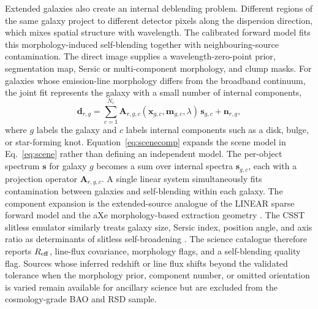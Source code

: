 Extended galaxies also create an internal deblending problem. Different regions of the same galaxy project to different detector pixels along the dispersion direction, which mixes spatial structure with wavelength. The calibrated forward model fits this morphology-induced self-blending together with neighbouring-source contamination. The direct image supplies a wavelength-zero-point prior, segmentation map, Sersic or multi-component morphology, and clump masks. For galaxies whose emission-line morphology differs from the broadband continuum, the joint fit represents the galaxy with a small number of internal components,
\begin{equation}
  \mathbf{d}_{r,g} =
  \sum_{c=1}^{N_c}
  \mathbf{A}_{r,g,c}(\mathbf{x}_{g,c},\mathbf{m}_{g,c},\lambda)\,
  \mathbf{s}_{g,c}
  +\mathbf{n}_{r,g},
  \label{eq:scenecomp}
\end{equation}
where $g$ labels the galaxy and $c$ labels internal components such as a disk, bulge, or star-forming knot. Equation~\eqref{eq:scenecomp} expands the scene model in Eq.~\eqref{eq:scene} rather than defining an independent model. The per-object spectrum $\mathbf{s}$ for galaxy $g$ becomes a sum over internal spectra $\mathbf{s}_{g,c}$, each with a projection operator $\mathbf{A}_{r,g,c}$. A single linear system simultaneously fits contamination between galaxies and self-blending within each galaxy. The component expansion is the extended-source analogue of the LINEAR sparse forward model and the aXe morphology-based extraction geometry \cite{axe2009,linear2018}. The CSST slitless emulator similarly treats galaxy size, Sersic index, position angle, and axis ratio as determinants of slitless self-broadening \cite{cess2024}. The science catalogue therefore reports $R_{\rm eff}$, line-flux covariance, morphology flags, and a self-blending quality flag. Sources whose inferred redshift or line flux shifts beyond the validated tolerance when the morphology prior, component number, or omitted orientation is varied remain available for ancillary science but are excluded from the cosmology-grade BAO and RSD sample.

